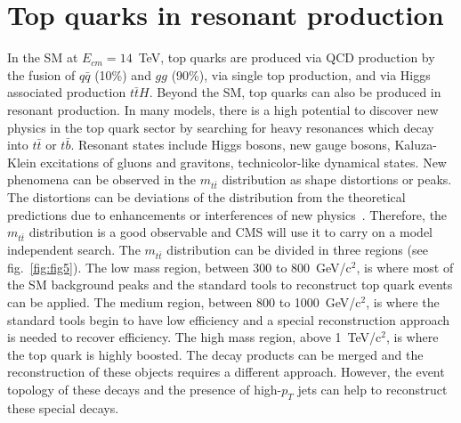 \documentclass{cimento}
\begin{document}
\section{Top quarks in resonant production}
\label{sec:Resonances}

In the SM at $E_{cm}=14$~TeV, top quarks are produced via QCD production by the fusion of $q\bar{q}$ (10\%) and
$gg$ (90\%), via single top production, and via Higgs associated production $t\bar{t}H$.
Beyond the SM, top quarks can also be produced in resonant production. In many models, there is
a high potential to discover new physics in the top quark sector by searching for
heavy resonances which decay into $t\bar{t}$ or $t\bar{b}$. Resonant states 
include Higgs bosons, new gauge bosons, Kaluza-Klein excitations of gluons and
gravitons, technicolor-like dynamical states. New phenomena can
be observed in the $m_{t\bar{t}}$ distribution as shape distortions or peaks. The distortions
can be deviations of the distribution from the theoretical predictions due to enhancements
or interferences of new physics~\cite{ref:Maltoni}. Therefore, the $m_{t\bar{t}}$
distribution is a good observable and CMS will use it to carry on a model independent search. The
$m_{t\bar{t}}$ distribution can be divided in three regions (see fig.~\ref{fig:fig5}). The low mass region, 
between 300 to 800~GeV/c$^2$, is where most of the SM background peaks and the
standard tools to reconstruct top quark events can be applied. The medium region,
between 800 to 1000~GeV/c$^2$, is where the standard tools begin to have low efficiency
and a special reconstruction approach is needed to recover efficiency. The high
mass region, above 1~TeV/c$^2$, is where the top quark is highly boosted. The decay
products can be merged and the reconstruction of these objects requires a different approach.
However, the event topology of these decays and the presence of high-$p_T$ jets can help
to reconstruct these special decays.
\end{document}
